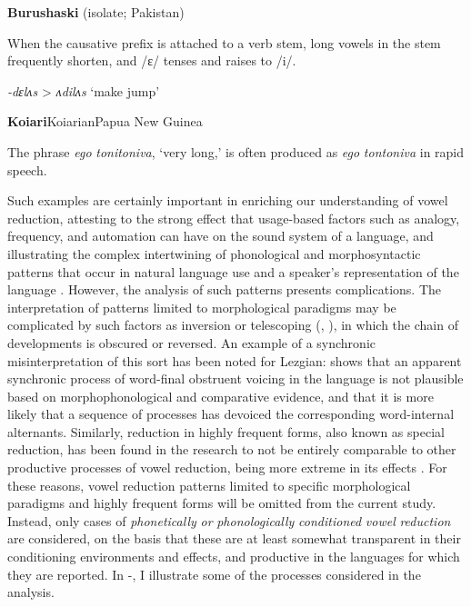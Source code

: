 \ea\label{ex:(6.4)}
   \textbf{Burushaski} (isolate; Pakistan)

When the causative prefix is attached to a verb stem, long vowels in the stem frequently shorten, and /ɛ/ tenses and raises to /i/.

\textit{-dɛlʌs} > \textit{ʌdilʌs} ‘make jump’

\citep[1030]{Anderson1997}
\z

\ea\label{ex:(6.5)}
 \textbf{Koiari}{Koiarian}{Papua New Guinea}

The phrase \textit{ego} \textit{tonitoniva}, ‘very long,’ is often produced as \textit{ego} \textit{tontoniva} in rapid speech.

\citep[7]{Dutton1996}

\z

  Such examples are certainly important in enriching our understanding of vowel reduction, attesting to the strong effect that usage-based factors such as analogy, frequency, and automation can have on the sound system of a language, and illustrating the complex intertwining of phonological and morphosyntactic patterns that occur in natural language use and a speaker’s representation of the language \citep{Bybee2001}. However, the analysis of such patterns presents complications. The interpretation of patterns limited to morphological paradigms may be complicated by such factors as inversion or telescoping (\citealt{Vennemann1972}, \citealt{Hyman1975}), in which the chain of developments is obscured or reversed. An example of a synchronic misinterpretation of this sort has been noted for Lezgian: \citet{Yu2004} shows that an apparent synchronic process of word-final obstruent voicing in the language is not plausible based on morphophonological and comparative evidence, and that it is more likely that a sequence of processes has devoiced the corresponding word-internal alternants. Similarly, reduction in highly frequent forms, also known as special reduction, has been found in the research to not be entirely comparable to other productive processes of vowel reduction, being more extreme in its effects \citep{BybeeEtAl2016}. For these reasons, vowel reduction patterns limited to specific morphological paradigms and highly frequent forms will be omitted from the current study. Instead, only cases of \textit{phonetically} \textit{or} \textit{phonologically} \textit{conditioned} \textit{vowel} \textit{reduction} are considered, on the basis that these are at least somewhat transparent in their conditioning environments and effects, and productive in the languages for which they are reported. In -, I illustrate some of the processes considered in the analysis.

